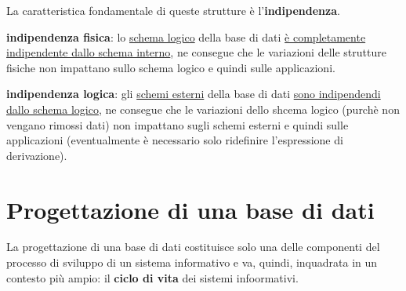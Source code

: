 \documentclass[a4paper, 12pt]{book}
\begin{document}
    
    La caratteristica fondamentale di queste strutture è l'\textbf{indipendenza}.
    \begin{description}
      \item \textbf{indipendenza fisica}: lo \uline{schema logico} della base di dati \uline{è completamente indipendente dallo schema interno}, ne consegue che le variazioni delle strutture fisiche non impattano sullo schema logico e quindi sulle applicazioni.
      \item \textbf{indipendenza logica}: gli \uline{schemi esterni} della base di dati \uline{sono indipendendi dallo schema logico}, ne consegue che le variazioni dello shcema logico (purchè non vengano rimossi dati) non impattano sugli schemi esterni e quindi sulle applicazioni (eventualmente è necessario solo ridefinire l'espressione di derivazione).
    \end{description}
     

    \chapter*{Progettazione di una base di dati}
    La progettazione di una base di dati costituisce solo una delle componenti del processo di sviluppo di un sistema informativo e va, quindi, inquadrata in un contesto più ampio: il \textbf{ciclo di vita} dei sistemi infoormativi.
\end{document}
